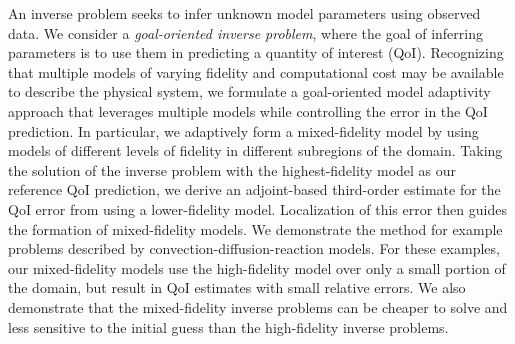 An inverse problem seeks to infer unknown model parameters using observed data. We consider a \textit{goal-oriented inverse problem}, where the goal of inferring parameters is to use them in predicting a quantity of interest (QoI). Recognizing that multiple models of varying fidelity and computational cost may be available to describe the physical system, we formulate a goal-oriented model adaptivity approach that leverages multiple models while controlling the error in the QoI prediction. In particular, we adaptively form a mixed-fidelity model by using models of different levels of fidelity in different subregions of the domain. Taking the solution of the inverse problem with the highest-fidelity model as our reference QoI prediction, we derive an adjoint-based third-order estimate for the QoI error from using a lower-fidelity model. Localization of this error then guides the formation of mixed-fidelity models. We demonstrate the method for example problems described by convection-diffusion-reaction models. For these examples, our mixed-fidelity models use the high-fidelity model over only a small portion of the domain, but result in QoI estimates with small relative errors. We also demonstrate that the mixed-fidelity inverse problems can be cheaper to solve and less sensitive to the initial guess than the high-fidelity inverse problems.

